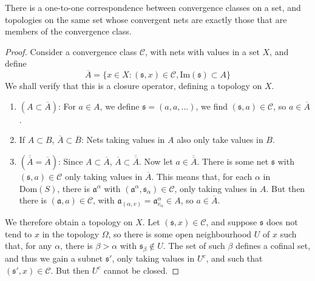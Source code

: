 \begin{example}
\begin{theorem}
    There is a one-to-one correspondence between convergence classes on a set, and topologies on the same set whose convergent nets are exactly those that are members of the convergence class.
\end{theorem}
\begin{proof}
    Consider a convergence class $\mathcal{C}$, with nets with values in a set $X$, and define
    \[ \overline{A} = \{ x \in X : (\mathfrak{s}, x) \in \mathcal{C}, \text{Im}(\mathfrak{s}) \subset A \} \]
    We shall verify that this is a closure operator, defining a topology on $X$.
    \begin{enumerate}
        \item $(A \subset \overline{A})$: For $a \in A$, we define $\mathfrak{s} = (a,a,\dots)$, we find $(\mathfrak{s},a) \in \mathcal{C}$, so $a \in \overline{A}$.
        \item If $A \subset B$, $\overline{A} \subset \overline{B}$: Nets taking values in $A$ also only take values in $B$.
        \item $(\overline{\overline{A}} = \overline{A})$: Since $A \subset \overline{A}$, $\overline{A} \subset \overline{\overline{A}}$. Now let $a \in \overline{\overline{A}}$. There is some net $\mathfrak{s}$ with $(\mathfrak{s},a) \in \mathcal{C}$ only taking values in $\overline{A}$. This means that, for each $\alpha$ in $\text{Dom}(S)$, there is $\mathfrak{a}^\alpha$ with $(\mathfrak{a}^\alpha, \mathfrak{s}_\alpha) \in \mathcal{C}$, only taking values in $A$. But then there is $(\mathfrak{a}, a) \in \mathcal{C}$, with $\mathfrak{a}_{(\alpha, v)} = \mathfrak{a}^\alpha_{v_\alpha} \in A$, so $a \in \overline{A}$.
    \end{enumerate}
    We therefore obtain a topology on $X$. Let $(\mathfrak{s},x) \in \mathcal{C}$, and suppose $\mathfrak{s}$ does not tend to $x$ in the topology $\Omega$, so there is some open neighbourhood $U$ of $x$ such that, for any $\alpha$, there is $\beta > \alpha$ with $\mathfrak{s}_\beta \not \in U$. The set of such $\beta$ defines a cofinal set, and thus we gain a subnet $\mathfrak{s}'$, only taking values in $U^c$, and such that $(\mathfrak{s}',x) \in \mathcal{C}$. But then $U^c$ cannot be closed.


\end{proof}
\end{example}
